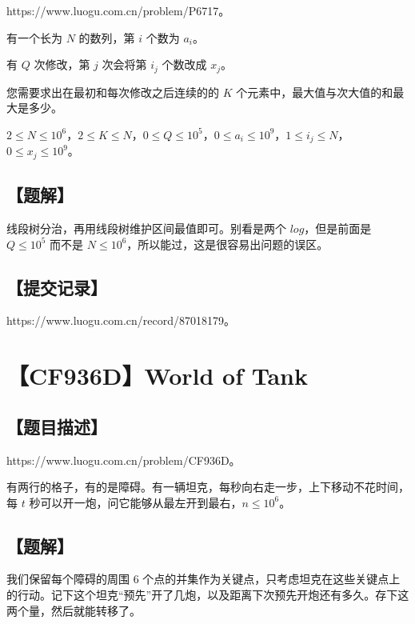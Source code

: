\documentclass[UTF8,12pt,a4paper]{ctexart}
\begin{document}
	https://www.luogu.com.cn/problem/P6717。
	
	有一个长为 $N$ 的数列，第 $i$ 个数为 $a_i$。
	
	有 $Q$ 次修改，第 $j$ 次会将第 $i_j$ 个数改成 $x_j$。
	
	您需要求出在最初和每次修改之后连续的的 $K$ 个元素中，最大值与次大值的和最大是多少。
	
	$2 \le N \le 10^6$，$2 \le K \le N$，$0 \le Q \le 10^5$，$0 \le a_i \le 10^9$，$1 \le i_j \le N$，$0 \le x_j \le 10^9$。
	
	\subsection*{【题解】}
	
	线段树分治，再用线段树维护区间最值即可。别看是两个 $log$，但是前面是 $Q\le 10^5$ 而不是 $N\le 10^6$，所以能过，这是很容易出问题的误区。
	
	\subsection*{【提交记录】}
	
	https://www.luogu.com.cn/record/87018179。
	
	
	\section*{【CF936D】World of Tank}
	
	\subsection*{【题目描述】}
	
	https://www.luogu.com.cn/problem/CF936D。
	
	有两行的格子，有的是障碍。有一辆坦克，每秒向右走一步，上下移动不花时间，每 $t$ 秒可以开一炮，问它能够从最左开到最右，$n\le 10^6$。
	
	\subsection*{【题解】}
	
	我们保留每个障碍的周围 $6$ 个点的并集作为关键点，只考虑坦克在这些关键点上的行动。记下这个坦克“预先”开了几炮，以及距离下次预先开炮还有多久。存下这两个量，然后就能转移了。
	
\end{document}
